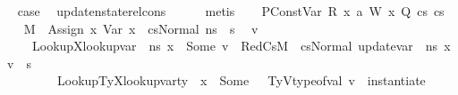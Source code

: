 \begin{isabellebody}
\ \isamarkupfalse%
\ {\isacharquery}{\kern0pt}case\ \isamarkupfalse%
\ update{\isacharunderscore}{\kern0pt}nstate{\isacharunderscore}{\kern0pt}rel{\isacharunderscore}{\kern0pt}cons\isanewline
\ \ \ \ \isamarkupfalse%
\ metis\isanewline
{}\isamarkupfalse%
\isanewline
\ \ \isamarkupfalse%
\ {\isacharparenleft}{\kern0pt}PConstVar\ R\ x{}{\isacharprime}{\kern0pt}\ a\ W\ x{}\ Q\ cs{}\ cs{}{\isacharparenright}{\kern0pt}\isanewline
\ \ \isamarkupfalse%
\ {\isacartoucheopen}M{\isacharcomma}{\kern0pt}{\isasymLambda}{\isacharcomma}{\kern0pt}{\isasymGamma}{\isacharcomma}{\kern0pt}{\isasymOmega}\ {\isasymturnstile}\ {\isasymlangle}Assign\ x{}\ {\isacharparenleft}{\kern0pt}Var\ x{}{\isacharprime}{\kern0pt}{\isacharparenright}{\kern0pt}\ {\isacharhash}{\kern0pt}\ cs{}{\isacharcomma}{\kern0pt}Normal\ ns{\isasymrangle}\ {\isacharbrackleft}{\kern0pt}{\isasymrightarrow}{\isacharbrackright}{\kern0pt}\ s{\isacharprime}{\kern0pt}{\isacartoucheclose}\ \isamarkupfalse%
\ v\ {\isasymtau}\isanewline
\ \ \ \ \ LookupX{}{\isacharprime}{\kern0pt}{\isacharcolon}{\kern0pt}{\isachardoublequoteopen}lookup{\isacharunderscore}{\kern0pt}var\ {\isasymLambda}\ ns\ x{}{\isacharprime}{\kern0pt}\ {\isacharequal}{\kern0pt}\ Some\ v{\isachardoublequoteclose}\ \ RedCs{}{\isacharcolon}{\kern0pt}{\isachardoublequoteopen}M{\isacharcomma}{\kern0pt}{\isasymLambda}{\isacharcomma}{\kern0pt}{\isasymGamma}{\isacharcomma}{\kern0pt}{\isasymOmega}\ {\isasymturnstile}\ {\isasymlangle}cs{}{\isacharcomma}{\kern0pt}Normal\ {\isacharparenleft}{\kern0pt}update{\isacharunderscore}{\kern0pt}var\ {\isasymLambda}\ ns\ x{}\ v{\isacharparenright}{\kern0pt}{\isasymrangle}\ {\isacharbrackleft}{\kern0pt}{\isasymrightarrow}{\isacharbrackright}{\kern0pt}\ s{\isacharprime}{\kern0pt}{\isachardoublequoteclose}\ \isanewline
\ \ \ \ \ \ \ \ \ LookupTyX{}{\isacharcolon}{\kern0pt}{\isachardoublequoteopen}lookup{\isacharunderscore}{\kern0pt}var{\isacharunderscore}{\kern0pt}ty\ {\isasymLambda}\ x{}\ {\isacharequal}{\kern0pt}\ Some\ {\isasymtau}{\isachardoublequoteclose}\ \ TyV{\isacharcolon}{\kern0pt}{\isachardoublequoteopen}type{\isacharunderscore}{\kern0pt}of{\isacharunderscore}{\kern0pt}val\ v\ {\isacharequal}{\kern0pt}\ instantiate\ {\isasymOmega}\ {\isasymtau}{\isachardoublequoteclose}\isanewline

\end{isabellebody}
